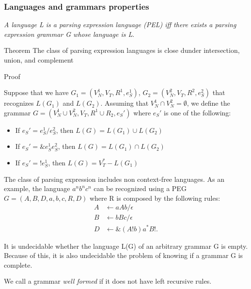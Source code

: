 \begin{frame}
	\small
	\frametitle{Languages and grammars properties}
	\begin{block}{}
		\emph{A language L is a parsing expression language (PEL) iff there exists a parsing expression grammar  G whose language is L}. 
	\end{block}
\begin{block}{Theorem}
	The class of parsing expression languages is close dunder intersection, union, and complement
\end{block}
\begin{block}{Proof}

Suppose that we  have $G_1 = (V_N^1,V_T, R^1,e_S^1)$, $G_2 = (V_N^2,V_T, R^2,e_S^2)$ that recognizes $L(G_1)$ and $L(G_2)$. Assuming that $V_N^1 \cap V_N^2 = \emptyset$, we define the grammar $G=(V_N^1 \cup V_N^2, V_T,R^1 \cup R_2, e_S')$ where $e_S'$ is one of the following:\begin{itemize}
	\item If $e_S' = e_S^1 / e_S^2$, then $L(G) = L(G_1) \cup L(G_2)$
	
	\item If $e_S' = \&e_S^1e_S^2$, then $L(G) = L(G_1) \cap L(G_2)$
	
	\item If $e_S' = !e_S^1$, then $L(G) = V_T^* - L(G_1)$
\end{itemize}
	
\end{block}
\end{frame}

\begin{frame}

	\small
	

	\begin{block}{}
	The class of parsing expression  includes non context-free languages. As an example, the language $a^nb^nc^n$ can be recognized using a PEG $G = ({A,B,D},{a,b,c},R,D)$ where R is composed by the following rules:
	\begin{align*}
		A  &\leftarrow  a A b / \epsilon \\
		B &\leftarrow bBc / \epsilon \\
		D &\leftarrow\&(A !b)a^*B!.
	\end{align*}
	\end{block}
		\begin{block}{}
		It is undecidable whether the language L(G) of an arbitrary grammar G is empty. Because of this, it is also undecidable the problem of knowing if a grammar G is complete.
	\end{block}
	\begin{block}{}
		We call a grammar \emph{well formed} if it does not have left recursive rules.
	\end{block}
\end{frame}


